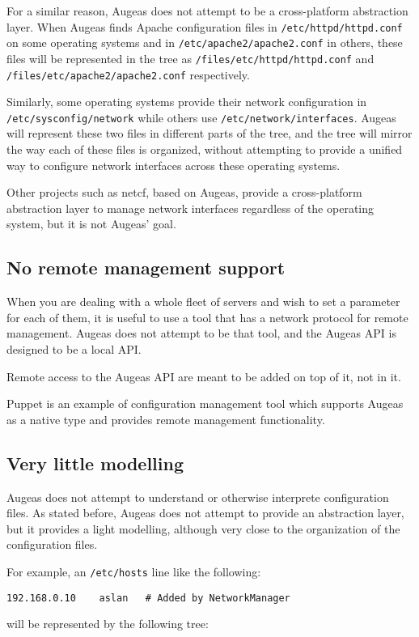 For a similar reason, Augeas does not attempt to be a cross-platform abstraction layer. When Augeas finds Apache configuration files in \verb!/etc/httpd/httpd.conf! on some operating systems and in \verb!/etc/apache2/apache2.conf! in others, these files will be represented in the tree as \verb!/files/etc/httpd/httpd.conf! and \verb!/files/etc/apache2/apache2.conf! respectively.

Similarly, some operating systems provide their network configuration in \verb!/etc/sysconfig/network! while others use \verb!/etc/network/interfaces!. Augeas will represent these two files in different parts of the tree, and the tree will mirror the way each of these files is organized, without attempting to provide a unified way to configure network interfaces across these operating systems.

Other projects such as netcf, based on Augeas, provide a cross-platform abstraction layer to manage network interfaces regardless of the operating system, but it is not Augeas' goal.

\subsection*{No remote management support}

When you are dealing with a whole fleet of servers and wish to set a parameter for each of them, it is useful to use a tool that has a network protocol for remote management. Augeas does not attempt to be that tool, and the Augeas API is designed to be a local API.

Remote access to the Augeas API are meant to be added on top of it, not in it.

Puppet is an example of configuration management tool which supports Augeas as a native type and provides remote management functionality.

\subsection*{Very little modelling}

Augeas does not attempt to understand or otherwise interprete configuration files. As stated before, Augeas does not attempt to provide an abstraction layer, but it provides a light modelling, although very close to the organization of the configuration files.

For example, an \verb!/etc/hosts! line like the following:

\begin{verbatim}
192.168.0.10    aslan   # Added by NetworkManager
\end{verbatim}
will be represented by the following tree:

